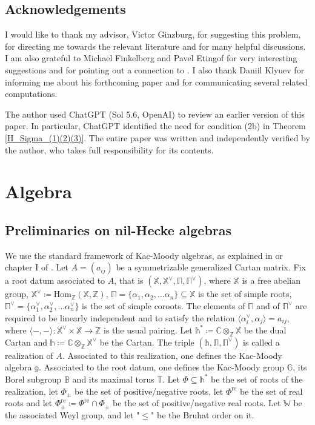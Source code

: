 \documentclass[11pt]{article}
\newcommand{\C}{\mathbb{C}}
\newcommand{\Z}{\mathbb{Z}}
\newcommand{\tG}{\mathbb{G}}
\newcommand{\1}{\mathbb{1}}
\newcommand{\X}{\mathbb{X}}
\newcommand{\tW}{\mathbb{W}}
\newcommand{\tT}{\mathbb{T}}
\newcommand{\tB}{\mathbb{B}}
\newcommand{\Hom}{\text{Hom}}
\newcommand{\bbPhire}{\mathbb{\Phi}^\text{re}}
\renewcommand{\subset}{\subseteq}
\theoremstyle{definition}
\numberwithin{equation}{section}
\begin{document}
\subsection*{Acknowledgements}
I would like to thank my advisor, Victor Ginzburg, for suggesting this problem, for directing me towards the relevant literature and for many helpful discussions. I am also grateful to Michael Finkelberg and Pavel Etingof for very interesting suggestions and for pointing out a connection to \cite{BEF}. I also thank Daniil Klyuev for informing me about his forthcoming paper \cite{Kly2} and for communicating several related computations.

The author used ChatGPT (Sol 5.6, OpenAI) to review an earlier version of this paper. In particular, ChatGPT identified the need for condition (2b) in Theorem \ref{H_Sigma_(1)(2)(3)}. The entire paper was written and independently verified by the author, who takes full responsibility for its contents.

\section{Algebra}

\label{section_algebra}

\subsection*{Preliminaries on nil-Hecke algebras}

We use the standard framework of Kac-Moody algebras, as explained in \cite{Ka} or chapter I of \cite{Ku}. Let $A=(a_{ij})$ be a symmetrizable generalized Cartan matrix. Fix a root datum associated to $A$, that is $({\X}, {\X}^\vee, \mathbb{\Pi}, {\mathbb{\Pi}}^\vee)$, where ${\X}$ is a free abelian group, ${\X}^\vee \coloneqq \Hom_\Z ({\X},\Z)$, $\mathbb{\Pi}=\{ \alpha_1, \alpha_2, \ldots \alpha_n\} \subset \X$ is the set of simple roots, $\mathbb{\Pi}^\vee = \{ \alpha_1^\vee, \alpha_2^\vee, \ldots \alpha_n^\vee\}$ is the set of simple coroots. The elements of $\mathbb{\Pi}$ and of $\mathbb{\Pi}^\vee$ are required to be linearly independent and to satisfy the relation $\langle \alpha_i^\vee, \alpha_j \rangle = a_{ij}$, where $\langle-,-\rangle : \X^\vee \times \X \rightarrow \Z$ is the usual pairing. Let $\mathbb{h}^* \coloneqq \C \otimes_{\Z}{\X}$ be the dual Cartan and $\mathbb{h} \coloneqq \C\otimes_{\Z} \X^\vee$ be the Cartan. The triple $(\mathbb{h},{\mathbb{\Pi}},{\mathbb{\Pi}}^\vee)$ is called a realization of $A$. Associated to this realization, one defines the Kac-Moody algebra $\mathbb{g}$. Associated to the root datum, one defines the Kac-Moody group $\tG$, its Borel subgroup $\tB$ and its maximal torus $\tT$. Let $\mathbb{\Phi}\subset \mathbb{h}^*$ be the set of roots of the realization, let $\mathbb{\Phi}_\pm$ be the set of positive/negative roots, let $\bbPhire$ be the set of real roots and let $\bbPhire_\pm \coloneqq \bbPhire \cap \mathbb{\Phi}_\pm$ be the set of positive/negative real roots.  Let $\tW$ be the associated Weyl group, and let "$\leq$" be the Bruhat order on it.
\end{document}
